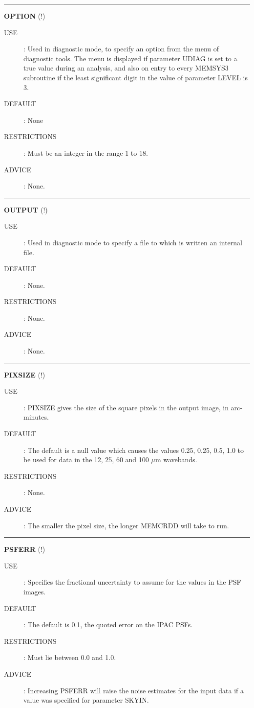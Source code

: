 \rule{\textwidth}{0.3mm}
{\Large {\bf OPTION} (!)}
\begin{description}
\item [USE]:
Used in diagnostic mode, to specify an option from the menu of diagnostic tools.
The menu is displayed if parameter UDIAG is set to a true value during an
analysis, and also on entry to every MEMSYS3 subroutine if the least significant
digit in the value of parameter LEVEL is 3.
\item [DEFAULT]:
None
\item [RESTRICTIONS]:
Must be an integer in the range 1 to 18.
\item [ADVICE]:
None.
\end {description}

\rule{\textwidth}{0.3mm}
{\Large {\bf OUTPUT } (!)}
\begin{description}
\item [USE]:
Used in diagnostic mode to specify a file to which is written an internal file.
\item [DEFAULT]:
None.
\item [RESTRICTIONS]:
None.
\item [ADVICE]:
None.\end {description}

\rule{\textwidth}{0.3mm}
{\Large {\bf PIXSIZE } (!)}
\begin{description}
\item [USE]:
PIXSIZE gives the size of the square pixels in the output image, in arc-minutes.
\item [DEFAULT]:
The default is a null value which causes the values 0.25, 0.25, 0.5, 1.0 to be
used for data in the 12, 25, 60 and 100 $\mu$m wavebands.
\item [RESTRICTIONS]:
None.
\item [ADVICE]:
The smaller the pixel size, the longer MEMCRDD will take to run.
\end {description}

\rule{\textwidth}{0.3mm}
{\Large {\bf PSFERR} (!)}
\begin{description}
\item [USE]:
Specifies the fractional uncertainty to assume for the values in the PSF images.
\item [DEFAULT]:
The default is 0.1, the quoted error on the IPAC PSFs.
\item [RESTRICTIONS]:
Must lie between 0.0 and 1.0.
\item [ADVICE]:
Increasing PSFERR will raise the noise estimates for the input data if a value
was specified for parameter SKYIN.
\end {description}

